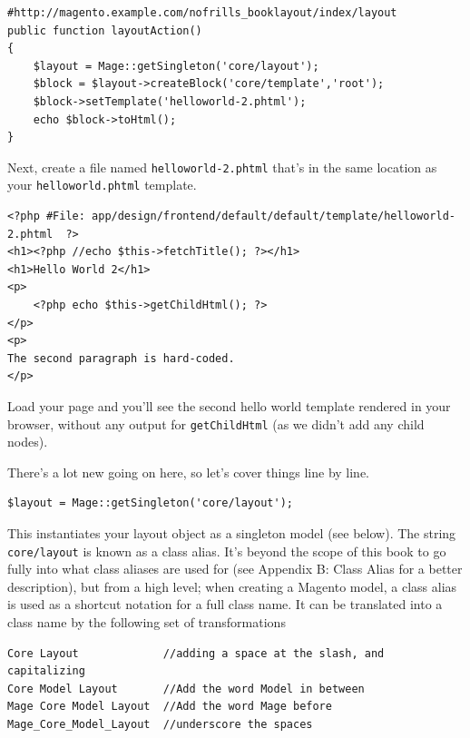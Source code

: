 \documentclass[oneside]{book}
\begin{document}
\begin{lstlisting}
#http://magento.example.com/nofrills_booklayout/index/layout
public function layoutAction()
{
    $layout = Mage::getSingleton('core/layout');                
    $block = $layout->createBlock('core/template','root');
    $block->setTemplate('helloworld-2.phtml');
    echo $block->toHtml();
}

\end{lstlisting}


Next, create a file named \footnotesize\texttt{helloworld-2.phtml} \normalsize  that's in the same location as your \footnotesize\texttt{helloworld.phtml} \normalsize  template.

\begin{lstlisting}
<?php #File: app/design/frontend/default/default/template/helloworld-2.phtml  ?>
<h1><?php //echo $this->fetchTitle(); ?></h1>
<h1>Hello World 2</h1>
<p>
    <?php echo $this->getChildHtml(); ?>    
</p>
<p>
The second paragraph is hard-coded.
</p>

\end{lstlisting}


Load your page and you'll see the second hello world template rendered in your browser, without any output for \footnotesize\texttt{getChildHtml} \normalsize  (as we didn't add any child nodes).

There's a lot new going on here, so let's cover things line by line.    

\begin{lstlisting}
$layout = Mage::getSingleton('core/layout');

\end{lstlisting}


This instantiates your layout object as a singleton model (see below). The string \footnotesize\texttt{core/layout} \normalsize  is known as a class alias.  It's beyond the scope of this book to go fully into what class aliases are used for (see Appendix B: Class Alias for a better description), but from a high level; when creating a Magento model, a class alias is used as a shortcut notation for a full class name.  It can be translated into a class name by the following set of transformations

\begin{lstlisting}
Core Layout             //adding a space at the slash, and capitalizing
Core Model Layout       //Add the word Model in between 
Mage Core Model Layout  //Add the word Mage before 
Mage_Core_Model_Layout  //underscore the spaces     

\end{lstlisting}
\end{document}
